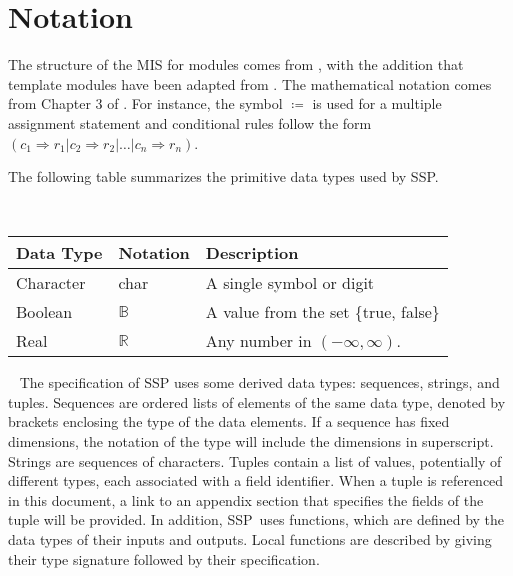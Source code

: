 \documentclass[12pt, titlepage]{article}
\newcommand{\progname}{SSP}
\begin{document}

\newpage

\section{Notation}

The structure of the MIS for modules comes from \citet{HoffmanAndStrooper1995},
with the addition that template modules have been adapted from
\cite{GhezziEtAl2003}.  The mathematical notation comes from Chapter 3 of
\citet{HoffmanAndStrooper1995}.  For instance, the symbol $\coloneqq$ is used 
for a multiple assignment statement and conditional rules follow the form $(c_1
\Rightarrow r_1 | c_2 \Rightarrow r_2 | \dots | c_n \Rightarrow r_n )$.

The following table summarizes the primitive data types used by \progname.

~\newline \renewcommand*{\arraystretch}{1.5}
\begin{tabular}{p{} p{} p{}}
  \hline \textbf{Data Type} & \textbf{Notation} & \textbf{Description}
  \\ \hline
  
  Character & char & A single symbol or digit\\

  Boolean & $\mathbb{B}$ & A value from the set \{true, false\}\\
  
  Real & $\mathbb{R}$ & Any number in $\left( -\infty, \infty
  \right)$.\\
  \bottomrule
\end{tabular}

~\newline
The specification of \progname{} uses some derived data types: sequences, 
strings, and tuples. Sequences are ordered lists of elements of the same data 
type, denoted by brackets enclosing the type of the data elements. If a 
sequence has fixed dimensions, the notation of the type will include the 
dimensions in superscript. Strings are sequences of characters. Tuples contain 
a list of values, potentially of different types, each associated with a field 
identifier. When a tuple is referenced in this document, a link to an appendix 
section that specifies the fields of the tuple will be provided. In addition, 
\progname \ uses functions, which are defined by the data types of their inputs 
and outputs. Local functions are described by giving their type signature 
followed by their specification.
\end{document}
